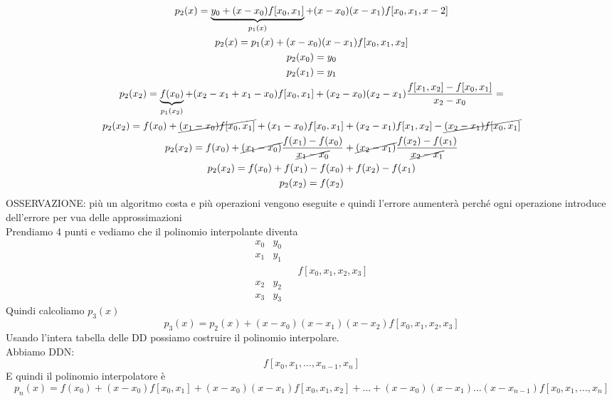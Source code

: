 \documentclass[a4paper, portrait]{book}
\numberwithin{equation}{chapter} %
\begin{document}
\begin{gather}
    p_2(x) = \underbrace{y_0 + (x-x_0)f[x_0,x_1]}_{p_1(x)} + (x-x_0)(x-x_1)f[x_0,x_1,x-2]\\
    p_2(x) = p_1(x) + (x-x_0)(x-x_1)f[x_0,x_1,x_2]\\
    p_2(x_0) = y_0\\
    p_2(x_1) = y_1\\
    p_2(x_2) = \underbrace{f(x_0)}_{p_1(x_2)} + (x_2 - x_1 + x_1 - x_0)f[x_0,x_1] + (x_2-x_0)(x_2-x_1)\frac{f[x_1,x_2]-f[x_0,x_1]}{x_2-x_0} =\\
    p_2(x_2) = f(x_0)+ \cancel{(x_1-x_0)f[x_0,x_1]} + (x_1-x_0)f[x_0,x_1]+(x_2-x_1)f[x_1,x_2]- \cancel{(x_2-x_1)f[x_0,x_1]}\\
    p_2(x_2) = f(x_0)+ \cancel{(x_1-x_0)}\frac{f(x_1)-f(x_0)}{\cancel{x_1-x_0}} + \cancel{(x_2-x_1)}\frac{f(x_2)-f(x_1)}{\cancel{x_2-x_1}}\\
    p_2(x_2) = f(x_0)+f(x_1)-f(x_0)+f(x_2)-f(x_1)\\
    p_2(x_2) = f(x_2)
\end{gather}
OSSERVAZIONE: più un algoritmo costa e più operazioni vengono eseguite e quindi l'errore aumenterà perché ogni operazione introduce dell'errore per vua delle approssimazioni\\
Prendiamo 4 punti e vediamo che il polinomio interpolante diventa
\begin{equation}
    \begin{matrix}
        x_0&y_0\\
        x_1&y_1&\\
        &&&f[x_0,x_1,x_2,x_3]\\
        x_2&y_2&\\
        x_3&y_3
    \end{matrix}
\end{equation}
Quindi calcoliamo $p_3(x)$
\begin{equation}
    p_3(x) = p_2(x) + (x-x_0)(x-x_1)(x-x_2)f[x_0,x_1,x_2,x_3]
\end{equation}
Usando l'intera tabella delle DD possiamo costruire il polinomio interpolare.\\
Abbiamo DDN:
\begin{equation}
    f[x_0,x_1,...,x_{n-1},x_n]
\end{equation}
E quindi il polinomio interpolatore è
\begin{equation}
    p_n(x) = f(x_0) + (x-x_0)f[x_0,x_1]+(x-x_0)(x-x_1)f[x_0,x_1,x_2]+...+(x-x_0)(x-x_1)...(x-x_{n-1})f[x_0,x_1,...,x_n]
\end{equation}
\end{document}

